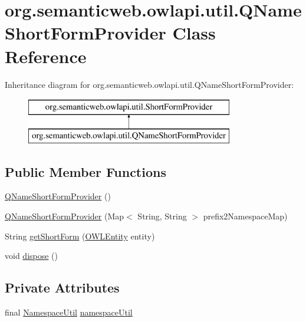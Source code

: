 \hypertarget{classorg_1_1semanticweb_1_1owlapi_1_1util_1_1_q_name_short_form_provider}{\section{org.\-semanticweb.\-owlapi.\-util.\-Q\-Name\-Short\-Form\-Provider Class Reference}
\label{classorg_1_1semanticweb_1_1owlapi_1_1util_1_1_q_name_short_form_provider}
}
Inheritance diagram for org.\-semanticweb.\-owlapi.\-util.\-Q\-Name\-Short\-Form\-Provider\-:\begin{figure}[H]
\begin{center}
\leavevmode
\includegraphics[height=2.000000cm]{classorg_1_1semanticweb_1_1owlapi_1_1util_1_1_q_name_short_form_provider}
\end{center}
\end{figure}
\subsection*{Public Member Functions}
\begin{DoxyCompactItemize}
\item 
\hyperlink{classorg_1_1semanticweb_1_1owlapi_1_1util_1_1_q_name_short_form_provider_aeac55ebb8ad07df35fa0a78d6bc548ee}{Q\-Name\-Short\-Form\-Provider} ()
\item 
\hyperlink{classorg_1_1semanticweb_1_1owlapi_1_1util_1_1_q_name_short_form_provider_a23cae1142de99fff5c46de6bc06b81c9}{Q\-Name\-Short\-Form\-Provider} (Map$<$ String, String $>$ prefix2\-Namespace\-Map)
\item 
String \hyperlink{classorg_1_1semanticweb_1_1owlapi_1_1util_1_1_q_name_short_form_provider_af516a899eeea41c822bbc6a1cc29e534}{get\-Short\-Form} (\hyperlink{interfaceorg_1_1semanticweb_1_1owlapi_1_1model_1_1_o_w_l_entity}{O\-W\-L\-Entity} entity)
\item 
void \hyperlink{classorg_1_1semanticweb_1_1owlapi_1_1util_1_1_q_name_short_form_provider_af10f95093b5b6b7db1e58e8d37f00e1d}{dispose} ()
\end{DoxyCompactItemize}
\subsection*{Private Attributes}
\begin{DoxyCompactItemize}
\item 
final \hyperlink{classorg_1_1semanticweb_1_1owlapi_1_1util_1_1_namespace_util}{Namespace\-Util} \hyperlink{classorg_1_1semanticweb_1_1owlapi_1_1util_1_1_q_name_short_form_provider_ad565b22015f009b9d64631c69f014ee9}{namespace\-Util}
\end{DoxyCompactItemize}



